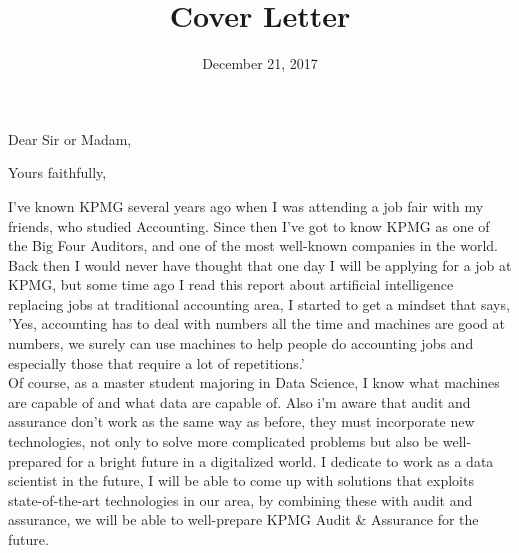 \documentclass[11pt,a4paper,sans]{moderncv}        %
\title{Cover Letter}                               %
\begin{document}
\date{December 21, 2017}
\opening{Dear Sir or Madam,}
\closing{Yours faithfully,}
\makelettertitle

I've known KPMG several years ago when I was attending a job fair with my friends, who studied Accounting. Since then I've got to know KPMG as one of the Big Four Auditors, and one of the most well-known companies in the world.\\

Back then I would never have thought that one day I will be applying for a job at KPMG, but some time ago I read this report about artificial intelligence replacing jobs at traditional accounting area, I started to get a mindset that says, 'Yes, accounting has to deal with numbers all the time and machines are good at numbers, we surely can use machines to help people do accounting jobs and especially those that require a lot of repetitions.'\\

Of course, as a master student majoring in Data Science, I know what machines are capable of and what data are capable of. Also i'm aware that audit and assurance don't work as the same way as before, they must incorporate new technologies, not only to solve more complicated problems but also be well-prepared for a bright future in a digitalized world. I dedicate to work as a data scientist in the future, I will be able to come up with solutions that exploits state-of-the-art technologies in our area, by combining these with audit and assurance, we will be able to well-prepare KPMG Audit \& Assurance for the future.


\makeletterclosing
\end{document}
